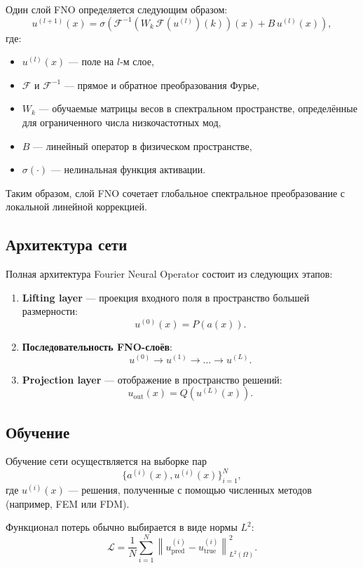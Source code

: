 \documentclass[12pt]{article}
\begin{document}
Один слой FNO определяется следующим образом:
\[
u^{(l+1)}(x)
=
\sigma\!\left(
\mathcal{F}^{-1}
\left(
W_k \, \mathcal{F}\left(u^{(l)}\right)(k)
\right)(x)
+
B \, u^{(l)}(x)
\right),
\]
где:
\begin{itemize}
\item $u^{(l)}(x)$ — поле на $l$-м слое,
\item $\mathcal{F}$ и $\mathcal{F}^{-1}$ — прямое и обратное преобразования Фурье,
\item $W_k$ — обучаемые матрицы весов в спектральном пространстве, определённые для ограниченного числа низкочастотных мод,
\item $B$ — линейный оператор в физическом пространстве,
\item $\sigma(\cdot)$ — нелинальная функция активации.
\end{itemize}

Таким образом, слой FNO сочетает глобальное спектральное преобразование с локальной линейной коррекцией.

\subsection*{Архитектура сети}

Полная архитектура Fourier Neural Operator состоит из следующих этапов:
\begin{enumerate}
\item \textbf{Lifting layer} — проекция входного поля в пространство большей размерности:
\[
u^{(0)}(x) = P(a(x)).
\]
\item \textbf{Последовательность FNO-слоёв}:
\[
u^{(0)} \to u^{(1)} \to \dots \to u^{(L)}.
\]
\item \textbf{Projection layer} — отображение в пространство решений:
\[
u_{\text{out}}(x) = Q(u^{(L)}(x)).
\]
\end{enumerate}

\subsection*{Обучение}

Обучение сети осуществляется на выборке пар
\[
\{ a^{(i)}(x), u^{(i)}(x) \}_{i=1}^{N},
\]
где $u^{(i)}(x)$ — решения, полученные с помощью численных методов (например, FEM или FDM).

Функционал потерь обычно выбирается в виде нормы $L^2$:
\[
\mathcal{L}
=
\frac{1}{N}
\sum_{i=1}^{N}
\left\|
u_{\text{pred}}^{(i)} - u_{\text{true}}^{(i)}
\right\|_{L^2(\Omega)}^2.
\]
\end{document}
